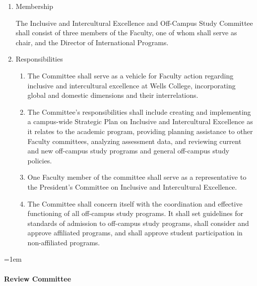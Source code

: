 \documentclass{manual}
\let\oldparagraph\paragraph
\renewcommand\paragraph{\leftskip=1em\oldparagraph}
\newcommand{\itemLevelA}{\alph*.}
\newcommand{\itemLevelB}{\arabic*)}
\newcommand{\itemRefA}{\alph*}
\newcommand{\itemRefB}{\arabic*}
\begin{document}
\begin{enumerate}[label=\itemLevelA,ref=\itemRefA]
\item Membership

The Inclusive and Intercultural Excellence and Off-Campus Study Committee shall consist of three members of the Faculty, one of whom shall serve as chair, and the Director of International Programs.
\item Responsibilities
\begin{enumerate}[label=\itemLevelB,ref=\itemRefB]
\item The Committee shall serve as a vehicle for Faculty action regarding inclusive and intercultural excellence at Wells College, incorporating global and domestic dimensions and their interrelations.
\item The Committee's responsibilities shall include creating and implementing a campus-wide Strategic Plan on Inclusive and Intercultural Excellence as it relates to the academic program, providing planning assistance to other Faculty committees, analyzing assessment data, and reviewing current and new off-campus study programs and general off-campus study policies.
\item One Faculty member of the committee shall serve as a representative to the President's Committee on Inclusive and Intercultural Excellence.

\item The Committee shall concern itself with the coordination and effective functioning of all off-campus study programs. It shall set guidelines for standards of admission to off-campus study programs, shall consider and approve affiliated programs, and shall approve student participation in non-affiliated programs.

\end{enumerate}
\end{enumerate}

\paragraph{Review Committee}\label{par:ReviewCommittee}
\end{document}
